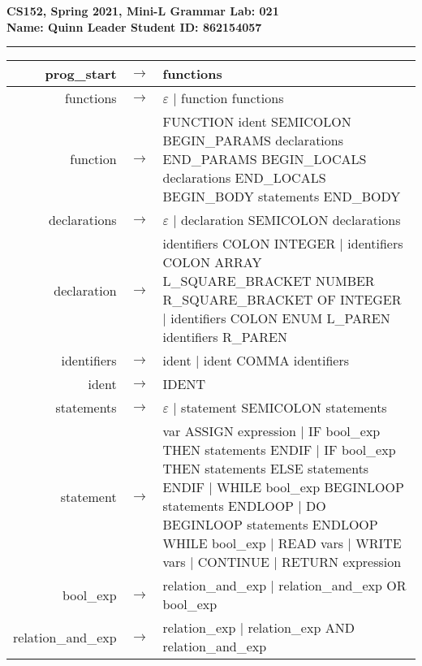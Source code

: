 \documentclass{article}[12pt]
\begin{document}
{
\noindent \large \bf
CS152, Spring 2021,
Mini-L Grammar
\hfill
Lab: 021\\
Name: Quinn Leader \hfill
Student ID: 862154057 \\
\noindent\rule{\textwidth}{1pt}
}

\begin{tabular}{r c l}
	prog\_start & $\rightarrow$ &
		functions \\
	\hline

	functions & $\rightarrow$ &
		  $\varepsilon$
		| function functions \\
	\hline

	function & $\rightarrow$ &
		  FUNCTION ident SEMICOLON BEGIN\_PARAMS declarations END\_PARAMS
		  BEGIN\_LOCALS declarations END\_LOCALS BEGIN\_BODY statements END\_BODY \\
	\hline

	declarations & $\rightarrow$ &
		  $\varepsilon$
		| declaration SEMICOLON declarations \\
	\hline

	declaration & $\rightarrow$ &
		  identifiers COLON INTEGER
		| identifiers COLON ARRAY L\_SQUARE\_BRACKET NUMBER R\_SQUARE\_BRACKET
		  OF INTEGER
		| identifiers COLON ENUM L\_PAREN identifiers R\_PAREN \\
	\hline

	identifiers & $\rightarrow$ &
		  ident
		| ident COMMA identifiers \\
	\hline

	ident & $\rightarrow$ &
		  IDENT \\
	\hline

	statements & $\rightarrow$ &
		  $\varepsilon$
		| statement SEMICOLON statements \\
	\hline

	statement & $\rightarrow$ &
		  var ASSIGN expression
		| IF bool\_exp THEN statements ENDIF
		| IF bool\_exp THEN statements ELSE statements ENDIF
		| WHILE bool\_exp BEGINLOOP statements ENDLOOP
		| DO BEGINLOOP statements ENDLOOP WHILE bool\_exp
		| READ vars
		| WRITE vars
		| CONTINUE
		| RETURN expression \\
	\hline

	bool\_exp & $\rightarrow$ &
		  relation\_and\_exp
		| relation\_and\_exp OR bool\_exp \\
	\hline

	relation\_and\_exp & $\rightarrow$ &
		  relation\_exp
		| relation\_exp AND relation\_and\_exp \\
	\hline


\end{tabular}
\end{document}
